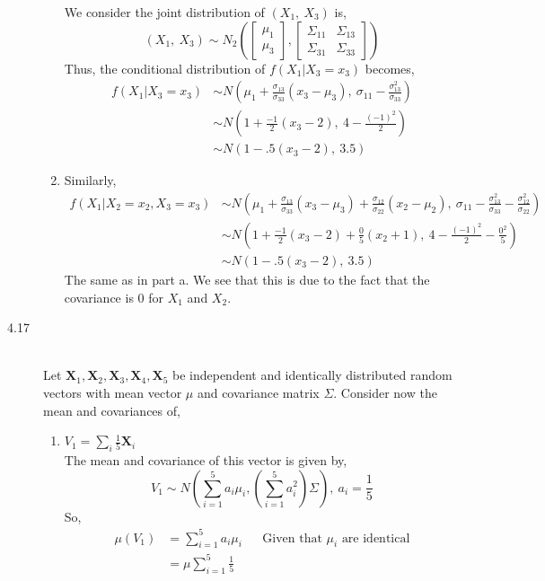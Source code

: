 \documentclass[letterpaper,10pt]{article}
\begin{document}
\begin{description}
\begin{enumerate}[label=\alph*.]
We consider the joint distribution of $(X_1,\ X_3)$ is,
\[(X_1,\ X_3)\sim N_2\left(\begin{bmatrix}
\mu_1\\ \mu_3
\end{bmatrix}, \begin{bmatrix}
\Sigma_{11} & \Sigma_{13}\\\Sigma_{31} & \Sigma_{33}
\end{bmatrix} \right)\]
Thus, the conditional distribution of $f(X_1|X_3=x_3)$ becomes,
\begin{align*}
f(X_1|X_3=x_3) &\sim N\left(\mu_1+\frac{\sigma_{13}}{\sigma_{33}}(x_3-\mu_3),\ \sigma_{11}-\frac{\sigma_{13}^2}{\sigma_{33}}\right)\\
&\sim N\left(1+\frac{-1}{2}(x_3-2),\ 4-\frac{(-1)^2}{2}\right)\\
&\sim N(1-.5(x_3-2),\ 3.5)
\end{align*}
\item Similarly,
\begin{align*}
f(X_1|X_2=x_2,X_3=x_3) &\sim N\left(\mu_1+\frac{\sigma_{13}}{\sigma_{33}}(x_3-\mu_3)+\frac{\sigma_{12}}{\sigma_{22}}(x_2-\mu_2),\ \sigma_{11}-\frac{\sigma_{13}^2}{\sigma_{33}}-\frac{\sigma_{12}^2}{\sigma_{22}}\right)\\
&\sim N\left(1+\frac{-1}{2}(x_3-2)+\frac{0}{5}(x_2+1),\ 4-\frac{(-1)^2}{2}-\frac{0^2}{5}\right)\\
&\sim N(1-.5(x_3-2),\ 3.5)
\end{align*}
The same as in part a. We see that this is due to the fact that the covariance is 0 for $X_1$ and $X_2$.
\end{enumerate}
\item[4.17]\hfill\\
Let $\textbf{X}_1,\textbf{X}_2,\textbf{X}_3,\textbf{X}_4,\textbf{X}_5$ be independent and identically distributed random vectors with mean vector $\mu$ and covariance matrix $\Sigma$. Consider now the mean and covariances of,
\begin{enumerate}[label=\alph*.]
\item $V_1=\sum_i\frac{1}{5}\textbf{X}_i$\\
The mean and covariance of this vector is given by,
\[V_1\sim N\left(\sum_{i=1}^{5}a_i\mu_i, \left(\sum_{i=1}^{5}a_i^2\right)\Sigma\right),\ a_i=\frac{1}{5}\]
So,
\begin{align*}
\mu(V_1) &= \sum_{i=1}^5a_i\mu_i && \text{Given that }\mu_i\text{ are identical}\\
&=\mu\sum_{i=1}^5\frac{1}{5}\\

\end{align*}
\end{enumerate}
\end{description}
\end{document}
